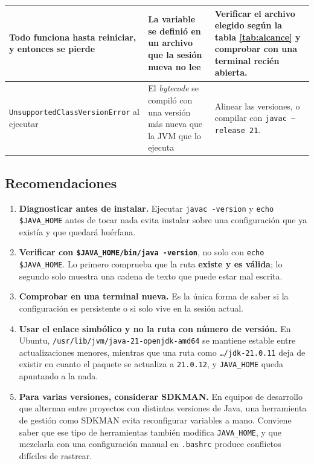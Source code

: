 \begin{longtable}{|>{\raggedright\arraybackslash}p{4.1cm}|>{\raggedright\arraybackslash}p{4.6cm}|>{\raggedright\arraybackslash}p{5.5cm}|}
	Todo funciona hasta reiniciar, y entonces se pierde & La variable se definió en un
	archivo que la sesión nueva no lee & Verificar el archivo elegido según la tabla
	\ref{tab:alcance} y comprobar con una terminal recién abierta. \\ \hline

	\texttt{Unsupported\allowbreak ClassVersion\allowbreak Error} al ejecutar & El \textit{bytecode} se compiló
	con una versión más nueva que la JVM que lo ejecuta & Alinear las versiones, o
	compilar con \texttt{javac --release 21}. \\ \hline
\end{longtable}

\normalsize
\setlength{\tabcolsep}{6pt}

\subsection{Recomendaciones}

\begin{enumerate}
	\item \textbf{Diagnosticar antes de instalar.} Ejecutar \texttt{javac -version} y
	\texttt{echo \$JAVA\_HOME} antes de tocar nada evita instalar sobre una configuración
	que ya existía y que quedará huérfana.

	\item \textbf{Verificar con \texttt{\$JAVA\_HOME/bin/java -version}}, no solo con
	\texttt{echo \$JAVA\_HOME}. Lo primero comprueba que la ruta \textbf{existe y es
	válida}; lo segundo solo muestra una cadena de texto que puede estar mal escrita.

	\item \textbf{Comprobar en una terminal nueva.} Es la única forma de saber si la
	configuración es persistente o si solo vive en la sesión actual.

	\item \textbf{Usar el enlace simbólico y no la ruta con número de versión.} En
	Ubuntu, \texttt{/usr/lib/\allowbreak jvm/\allowbreak java-21-\allowbreak openjdk-amd64} se mantiene estable entre
	actualizaciones menores, mientras que una ruta como
	\texttt{\dots/jdk-21.0.11} deja de existir en cuanto el paquete se actualiza a
	\texttt{21.0.12}, y \texttt{JAVA\_HOME} queda apuntando a la nada.

	\item \textbf{Para varias versiones, considerar SDKMAN.} En equipos de desarrollo que
	alternan entre proyectos con distintas versiones de Java, una herramienta de gestión
	como SDKMAN evita reconfigurar variables a mano. Conviene saber que ese tipo de
	herramientas también modifica \texttt{JAVA\_HOME}, y que mezclarla con una
	configuración manual en \texttt{.bashrc} produce conflictos difíciles de rastrear.
\end{enumerate}

